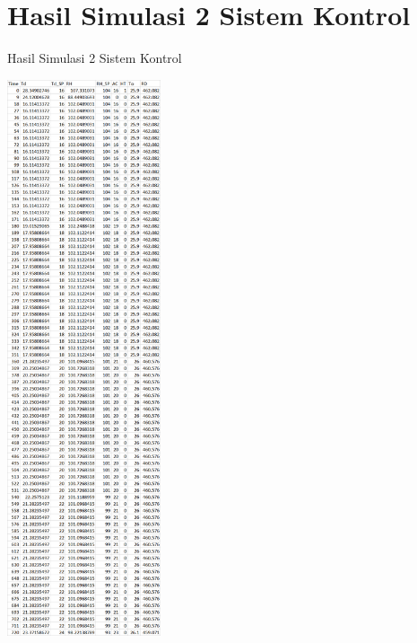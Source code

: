 \section{Hasil Simulasi 2 Sistem Kontrol}
\begin{table}[!h]
	\caption{Hasil Simulasi 2 Sistem Kontrol}
	\label{tbl:A:HasilSimulasiKontrol21}
	\centering
	\includegraphics[width=0.34\textwidth]{figures/HasilSimulasiSimulink21}
\end{table}
\break

